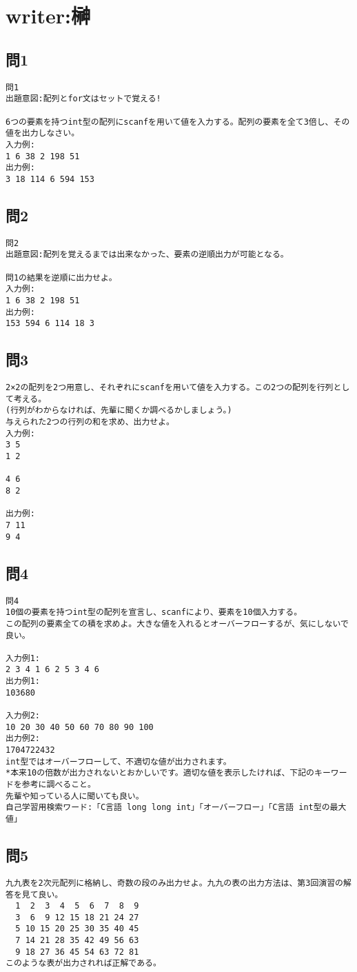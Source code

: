 \section{writer:榊}

\subsection{問1}
\begin{verbatim}
問1
出題意図:配列とfor文はセットで覚える!

6つの要素を持つint型の配列にscanfを用いて値を入力する。配列の要素を全て3倍し、その値を出力しなさい。
入力例:
1 6 38 2 198 51
出力例:
3 18 114 6 594 153
\end{verbatim}


\subsection{問2}
\begin{verbatim}
問2
出題意図:配列を覚えるまでは出来なかった、要素の逆順出力が可能となる。

問1の結果を逆順に出力せよ。
入力例:
1 6 38 2 198 51
出力例:
153 594 6 114 18 3
\end{verbatim}

\subsection{問3}
\begin{verbatim}
2×2の配列を2つ用意し、それぞれにscanfを用いて値を入力する。この2つの配列を行列として考える。
(行列がわからなければ、先輩に聞くか調べるかしましょう。)
与えられた2つの行列の和を求め、出力せよ。
入力例:
3 5
1 2

4 6
8 2

出力例:
7 11
9 4
\end{verbatim}

\subsection{問4}
\begin{verbatim}
問4
10個の要素を持つint型の配列を宣言し、scanfにより、要素を10個入力する。
この配列の要素全ての積を求めよ。大きな値を入れるとオーバーフローするが、気にしないで良い。

入力例1:
2 3 4 1 6 2 5 3 4 6
出力例1:
103680

入力例2:
10 20 30 40 50 60 70 80 90 100
出力例2:
1704722432
int型ではオーバーフローして、不適切な値が出力されます。
*本来10の倍数が出力されないとおかしいです。適切な値を表示したければ、下記のキーワードを参考に調べること。
先輩や知っている人に聞いても良い。
自己学習用検索ワード:「C言語 long long int」「オーバーフロー」「C言語 int型の最大値」
\end{verbatim}

\subsection{問5}
\begin{verbatim}
九九表を2次元配列に格納し、奇数の段のみ出力せよ。九九の表の出力方法は、第3回演習の解答を見て良い。
  1  2  3  4  5  6  7  8  9
  3  6  9 12 15 18 21 24 27
  5 10 15 20 25 30 35 40 45
  7 14 21 28 35 42 49 56 63
  9 18 27 36 45 54 63 72 81
このような表が出力されれば正解である。
\end{verbatim}
